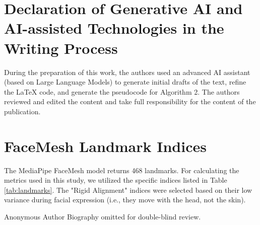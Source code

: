 \documentclass[journal]{IEEEtran}
\begin{document}
\section*{Declaration of Generative AI and AI-assisted Technologies in the Writing Process}
During the preparation of this work, the authors used an advanced AI assistant (based on Large Language Models) to generate initial drafts of the text, refine the LaTeX code, and generate the pseudocode for Algorithm 2. The authors reviewed and edited the content and take full responsibility for the content of the publication.

\appendices

\section{FaceMesh Landmark Indices}
The MediaPipe FaceMesh model returns 468 landmarks. For calculating the metrics used in this study, we utilized the specific indices listed in Table \ref{tab:landmarks}.
The "Rigid Alignment" indices were selected based on their low variance during facial expression (i.e., they move with the head, not the skin).



\ifCLASSOPTIONcaptionsoff
  \newpage
\fi




\begin{IEEEbiography}{Anonymous Author}
Biography omitted for double-blind review.
\end{IEEEbiography}

\vfill
\end{document}
